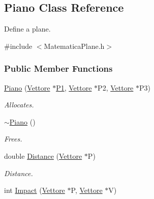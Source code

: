 \hypertarget{classPiano}{\subsection{\-Piano \-Class \-Reference}
\label{classPiano}
}


\-Define a plane.  




{\ttfamily \#include $<$\-Matematica\-Plane.\-h$>$}

\subsubsection*{\-Public \-Member \-Functions}
\begin{DoxyCompactItemize}
\item 
\hypertarget{classPiano_a3e0f72f2e5410fb6ac0994b962e3b0f4}{\hyperlink{classPiano_a3e0f72f2e5410fb6ac0994b962e3b0f4}{\-Piano} (\hyperlink{classVettore}{\-Vettore} $\ast$\hyperlink{classPiano_aca046e5963a53f1b4a12c2ad4617149b}{\-P1}, \hyperlink{classVettore}{\-Vettore} $\ast$\-P2, \hyperlink{classVettore}{\-Vettore} $\ast$\-P3)}\label{classPiano_a3e0f72f2e5410fb6ac0994b962e3b0f4}

\begin{DoxyCompactList}\small\item\em \-Allocates. \end{DoxyCompactList}\item 
\hypertarget{classPiano_ae2f8ebc5dd8ecab651c1e8a0551ec11d}{\hyperlink{classPiano_ae2f8ebc5dd8ecab651c1e8a0551ec11d}{$\sim$\-Piano} ()}\label{classPiano_ae2f8ebc5dd8ecab651c1e8a0551ec11d}

\begin{DoxyCompactList}\small\item\em \-Frees. \end{DoxyCompactList}\item 
\hypertarget{classPiano_a8ec22e845b3d00f3a815a132132fc9a1}{double \hyperlink{classPiano_a8ec22e845b3d00f3a815a132132fc9a1}{\-Distance} (\hyperlink{classVettore}{\-Vettore} $\ast$\-P)}\label{classPiano_a8ec22e845b3d00f3a815a132132fc9a1}

\begin{DoxyCompactList}\small\item\em \-Distance. \end{DoxyCompactList}\item 
\hypertarget{classPiano_a119e25248ace7e082367a7b64e3bcbc1}{int \hyperlink{classPiano_a119e25248ace7e082367a7b64e3bcbc1}{\-Impact} (\hyperlink{classVettore}{\-Vettore} $\ast$\-P, \hyperlink{classVettore}{\-Vettore} $\ast$\-V)}\label{classPiano_a119e25248ace7e082367a7b64e3bcbc1}


\end{DoxyCompactItemize}
